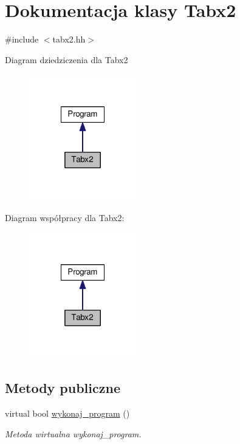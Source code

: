 \hypertarget{class_tabx2}{\section{Dokumentacja klasy Tabx2}
\label{class_tabx2}
}


{\ttfamily \#include $<$tabx2.\-hh$>$}



Diagram dziedziczenia dla Tabx2\nopagebreak
\begin{figure}[H]
\begin{center}
\leavevmode
\includegraphics[width=132pt]{class_tabx2__inherit__graph}
\end{center}
\end{figure}


Diagram współpracy dla Tabx2\-:\nopagebreak
\begin{figure}[H]
\begin{center}
\leavevmode
\includegraphics[width=132pt]{class_tabx2__coll__graph}
\end{center}
\end{figure}
\subsection*{Metody publiczne}
\begin{DoxyCompactItemize}
\item 
virtual bool \hyperlink{class_tabx2_a30db6636cba36a354443ec5f101fd188}{wykonaj\-\_\-program} ()
\begin{DoxyCompactList}\small\item\em Metoda wirtualna wykonaj\-\_\-program. \end{DoxyCompactList}\end{DoxyCompactItemize}
